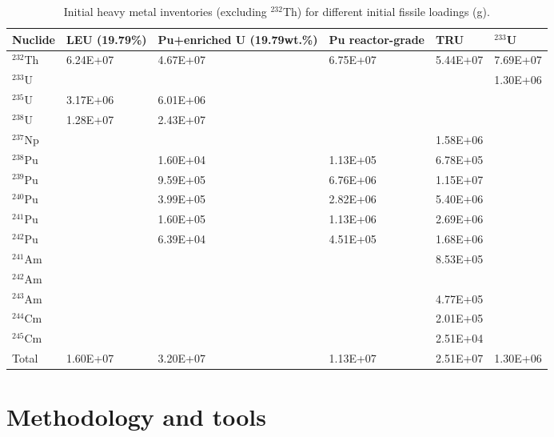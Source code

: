 \begin{table}  %
	\caption{Initial heavy metal inventories (excluding $^{232}$Th) for 
	different initial fissile loadings (g).}
	\vspace{0.1in}
	\begin{tabularx}{\textwidth}{X X p{} 
	p{} X X}
		\hline
		Nuclide & \gls{LEU} (19.79\%) & Pu+enriched U (19.79wt.\%) & Pu 
		reactor-grade & \gls{TRU}& $^{233}$U \\	\hline
		$^{232}$Th       &6.24E+07 & 4.67E+07 &   6.75E+07			& 5.44E+07	& 7.69E+07    \\ 
		$^{233}$U        &         & &        &       &  1.30E+06 \\
		$^{235}$U        & 3.17E+06 &6.01E+06	&            &   & \\
		$^{238}$U      	 &1.28E+07  &2.43E+07 &	&  &\\
		$^{237}$Np	  	 &         && &1.58E+06	&    \\
		$^{238}$Pu	  	 &         &1.60E+04	& 1.13E+05 & 6.78E+05	&   \\
		$^{239}$Pu       &         &9.59E+05&6.76E+06& 1.15E+07&    \\
		$^{240}$Pu       &         &3.99E+05& 2.82E+06&5.40E+06&  	\\  
		$^{241}$Pu		 &         &1.60E+05&1.13E+06&2.69E+06&   \\
		$^{242}$Pu		 &         &6.39E+04	&4.51E+05	& 1.68E+06& \\
		$^{241}$Am		 &         &&& 8.53E+05 & \\
		$^{242}$Am		 &         &&&  &\\
		$^{243}$Am       &        & &&4.77E+05&\\
		$^{244}$Cm		 &        & &&2.01E+05&  \\
		$^{245}$Cm		 &        & &&			2.51E+04	&   \\ \hline
		Total            & 1.60E+07& 3.20E+07&1.13E+07&  2.51E+07&   1.30E+06  
		\\
		\hline
	\end{tabularx}
\label{tab:table5}
\end{table}


\section{Methodology and tools} \label{Methodology-and-tools}

